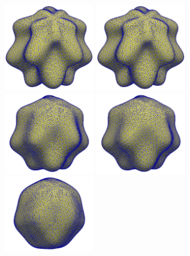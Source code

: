 \begin{figure}[p]
	\centering
	\includegraphics[width=0.35\textwidth]{bumpy_noRed_level5_tstep0_FT.png}
	\hspace{0.1\textwidth}
	\includegraphics[width=0.35\textwidth]{bumpy_noRed_level5_tstep0_FT.png}
	\newline
	\includegraphics[width=0.35\textwidth]{bumpy_noRed_level5_tstep20.png}
	\hspace{0.1\textwidth}
	\includegraphics[width=0.35\textwidth]{bumpy_omega100_level5_tstep20.png}
	\newline
	\includegraphics[width=0.35\textwidth]{bumpy_noRed_level5_tstep50.png}

\end{figure}
